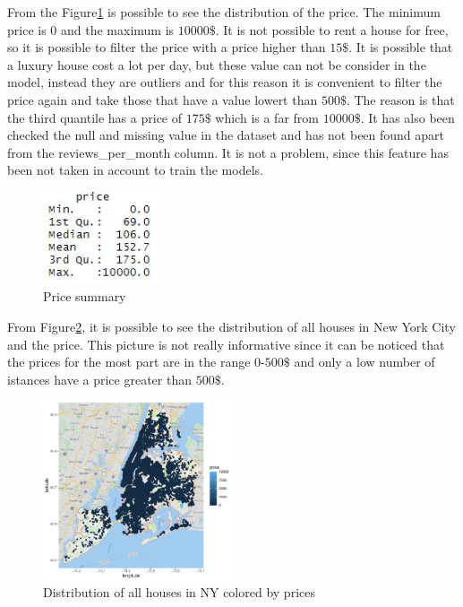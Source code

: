 \documentclass{FR16}
\begin{document}
From the Figure\ref{fig:1} is possible to see the distribution of the price. The minimum price is $0$ and the maximum is $10000\$$. It is not possible to rent a house for free, so it is possible to filter the price with a price higher than $15\$$. It is possible that a luxury house cost a lot per day, but these value can not be consider in the model, instead they are outliers and for this reason it is convenient to filter the price again and take those that have a value lowert than $500\$$. The reason is that the third quantile has a price of $175\$$ which is a far from $10000\$$. It has also been checked the null and missing value  in the dataset and has not been found apart from the reviews\_per\_month column. It is not a problem, since this feature has been not taken in account to train the models. 
\\
\begin{figure}[H]
\centering
\includegraphics[width=0.3\textwidth]{figures/figure1.jpg} 
\caption{\label{fig:1}Price summary}
\end{figure}
\noindent From Figure\ref{fig:2}, it is possible to see the distribution of all houses in New York City and the price. This picture is not really informative since it can be noticed that the prices for the most part are in the range $0$-$500\$$ and only a low number of istances have a price greater than $500\$$.

\begin{figure}[H]
\centering
\includegraphics[width=0.5\textwidth]{figures/figure2.pdf} 
\caption{\label{fig:2}Distribution of all houses in NY colored by prices}
\end{figure}
\noindent
\end{document}

